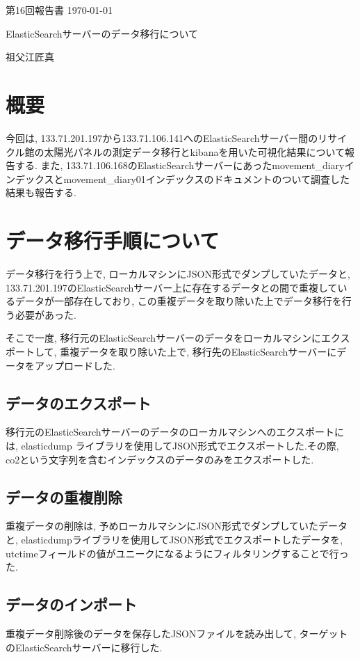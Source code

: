 \documentclass[a4j,12pt,]{jarticle}
\begin{document}
{\noindent\small 第16回報告書 \hfill\today}
\begin{center}
  {\Large ElasticSearchサーバーのデータ移行について}
\end{center}
\begin{flushright}
  祖父江匠真 \\
\end{flushright}

\section{概要}
今回は, 133.71.201.197から133.71.106.141へのElasticSearchサーバー間のリサイクル館の太陽光パネルの測定データ移行とkibanaを用いた可視化結果について報告する.
また, 133.71.106.168のElasticSearchサーバーにあったmovement\_diaryインデックスとmovement\_diary01インデックスのドキュメントのついて調査した結果も報告する.

\section{データ移行手順について}

データ移行を行う上で, ローカルマシンにJSON形式でダンプしていたデータと, 133.71.201.197のElasticSearchサーバー上に存在するデータとの間で重複しているデータが一部存在しており, この重複データを取り除いた上でデータ移行を行う必要があった.

そこで一度, 移行元のElasticSearchサーバーのデータをローカルマシンにエクスポートして, 重複データを取り除いた上で, 移行先のElasticSearchサーバーにデータをアップロードした.

\subsection{データのエクスポート}
移行元のElasticSearchサーバーのデータのローカルマシンへのエクスポートには, elasticdump \cite{1}ライブラリを使用してJSON形式でエクスポートした.その際, co2という文字列を含むインデックスのデータのみをエクスポートした.

\subsection{データの重複削除}
重複データの削除は, 予めローカルマシンにJSON形式でダンプしていたデータと, elasticdumpライブラリを使用してJSON形式でエクスポートしたデータを, utctimeフィールドの値がユニークになるようにフィルタリングすることで行った.

\subsection{データのインポート}
重複データ削除後のデータを保存したJSONファイルを読み出して, ターゲットのElasticSearchサーバーに移行した.
\end{document}
